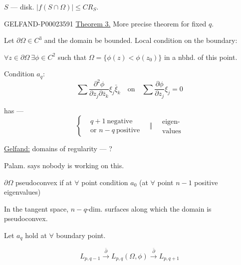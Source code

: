 $S$ — disk. $|f (S\cap\Omega)|\le C R_S$.



\begin{GelfandAdjacentEvidence}{GELFAND-P000235}{91}
\underline{Theorem 3.} More precise theorem for fixed $q$.



Let $\partial\Omega\in C^3$ and the domain be bounded. Local condition on the boundary:



$\forall z\in\partial\Omega\ \exists\phi\in C^2$ such that $\Omega=\{\phi (z)<\phi (z_0)\}$ in a nbhd. of this point.



Condition $a_q$:
\begin{equation*}
 \sum\frac{\partial^2\phi}{\partial z_j\partial\bar z_k}\xi_j\bar\xi_k
 \quad\text{on}\quad
 \sum\frac{\partial\phi}{\partial z_j}\xi_j=0
\end{equation*}



has —
\begin{equation*}
 \left\{\begin{aligned}&q+1\ \text{negative}\\&\text{or }n-q\ \text{positive}\end{aligned}\right.
 \quad\Vert\quad\substack{\text{eigen-}\\\text{values}}
\end{equation*}




\end{GelfandAdjacentEvidence}\underline{Gelfand:} domains of regularity — ?



Palam. says nobody is working on this.



$\partial\Omega$ pseudoconvex if at $\forall$ point condition $a_0$ (at $\forall$ point $n-1$ positive eigenvalues)



In the tangent space, $n-q$-dim. surfaces along which the domain is pseudoconvex.



Let $a_q$ hold at $\forall$ boundary point.



\begin{equation*}
 L_{p, q-1}\overset{\bar\partial}{\longrightarrow}
 L_{p, q}(\Omega,\phi)\overset{\bar\partial}{\longrightarrow}L_{p, q+1}
\end{equation*}



